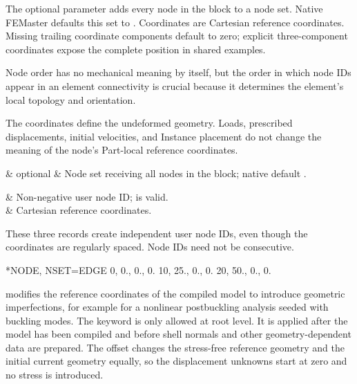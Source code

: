 The optional  parameter adds every node in the block to a node set. Native FEMaster defaults this set to . Coordinates are Cartesian reference coordinates. Missing trailing coordinate components default to zero; explicit three-component coordinates expose the complete position in shared examples.

Node order has no mechanical meaning by itself, but the order in which node IDs appear in an element connectivity is crucial because it determines the element's local topology and orientation.

The coordinates define the undeformed geometry. Loads, prescribed displacements, initial velocities, and Instance placement do not change the meaning of the node's Part-local reference coordinates.

\begin{keywordparameters}
 & optional & Node set receiving all nodes in the block; native default . \\
\end{keywordparameters}

\begin{keyworddata}
 & Non-negative user node ID;  is valid. \\
 & Cartesian reference coordinates. \\
\end{keyworddata}

These three records create independent user node IDs, even though the coordinates are regularly spaced. Node IDs need not be consecutive.

\exampleheading

\begin{inputdeck}
*NODE, NSET=EDGE
0,  0., 0., 0.
10, 25., 0., 0.
20, 50., 0., 0.
\end{inputdeck}


 modifies the reference coordinates of the compiled model to introduce geometric imperfections, for example for a nonlinear postbuckling analysis seeded with buckling modes. The keyword is only allowed at root level. It is applied after the model has been compiled and before shell normals and other geometry-dependent data are prepared. The offset changes the stress-free reference geometry and the initial current geometry equally, so the displacement unknowns start at zero and no stress is introduced.

